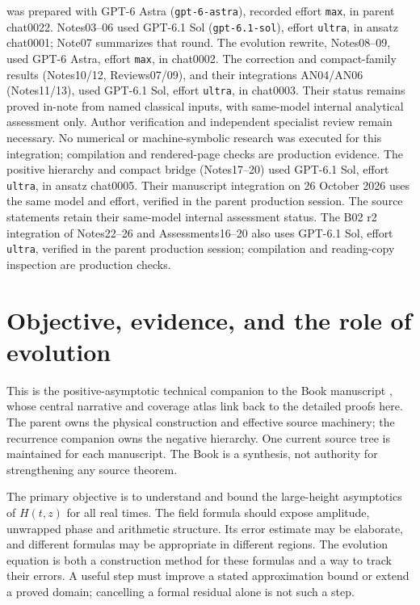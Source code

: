 \documentclass[11pt]{article}
\numberwithin{equation}{section}
\begin{document}
was prepared with GPT-6 Astra (\texttt{gpt-6-astra}), recorded effort
\texttt{max}, in parent chat0022. Notes03--06 used GPT-6.1 Sol
(\texttt{gpt-6.1-sol}), effort \texttt{ultra}, in ansatz chat0001;
Note07 summarizes that round. The evolution rewrite, Notes08--09,
used GPT-6 Astra, effort \texttt{max}, in chat0002. The correction and
compact-family results (Notes10/12, Reviews07/09), and their integrations
AN04/AN06 (Notes11/13), used GPT-6.1 Sol, effort \texttt{ultra}, in
chat0003. Their status remains proved in-note from named classical
inputs, with same-model internal analytical assessment only. Author
verification and independent specialist review remain necessary.
No numerical or machine-symbolic research was executed for this
integration; compilation and rendered-page checks are production evidence.
The positive hierarchy and compact bridge (Notes17--20) used GPT-6.1
Sol, effort \texttt{ultra}, in ansatz chat0005. Their manuscript
integration on 26 October 2026 uses the same model and effort, verified
in the parent production session. The source statements retain their
same-model internal assessment status. The B02 r2 integration of
Notes22--26 and Assessments16--20 also uses GPT-6.1 Sol, effort
\texttt{ultra}, verified in the parent production session; compilation
and reading-copy inspection are production checks.
\par\endgroup
\newpage
\begingroup
\small
\setlength{\parskip}{0pt}
\tableofcontents
\endgroup
\newpage

\section{Objective, evidence, and the role of evolution}
\label{sec:objective}
This is the positive-asymptotic technical companion to the Book
manuscript \cite{book}, whose central narrative and coverage atlas
link back to the detailed proofs here. The parent \cite{parent} owns
the physical construction and effective source machinery; the recurrence
companion \cite{recurrence} owns the negative hierarchy. One current
source tree is maintained for each manuscript. The Book is a synthesis,
not authority for strengthening any source theorem.

The primary objective is to understand and bound the large-height
asymptotics of \(H(t,z)\) for all real times. The field formula should
expose amplitude, unwrapped phase and arithmetic structure. Its error
estimate may be elaborate, and different formulas may be appropriate
in different regions. The evolution equation is both a construction
method for these formulas and a way to track their errors. A useful
step must improve a stated approximation bound or extend a proved
domain; cancelling a formal residual alone is not such a step.
\end{document}
